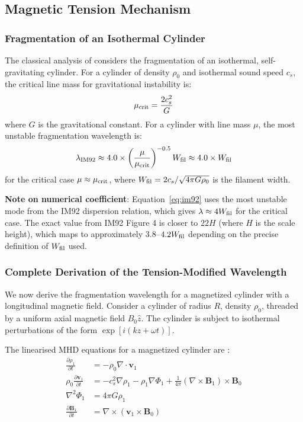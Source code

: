 \documentclass[11pt,a4paper]{article}
\begin{document}
\subsection{Magnetic Tension Mechanism}

\subsubsection{Fragmentation of an Isothermal Cylinder}

The classical analysis of \citet{Inutsuka1992} considers the fragmentation of an isothermal, self-gravitating cylinder. For a cylinder of density $\rho_0$ and isothermal sound speed $c_s$, the critical line mass for gravitational instability is:
\begin{equation}
\mu_{\rm crit} = \frac{2c_s^2}{G}
\end{equation}
where $G$ is the gravitational constant. For a cylinder with line mass $\mu$, the most unstable fragmentation wavelength is:
\begin{equation}
\lambda_{\rm IM92} \approx 4.0 \times \left(\frac{\mu}{\mu_{\rm crit}}\right)^{-0.5} W_{\rm fil} \approx 4.0 \times W_{\rm fil}
\label{eq:im92}
\end{equation}
for the critical case $\mu \approx \mu_{\rm crit}$, where $W_{\rm fil} = 2c_s/\sqrt{4\pi G\rho_0}$ is the filament width.

\textbf{Note on numerical coefficient}: Equation~\ref{eq:im92} uses the most unstable mode from the IM92 dispersion relation, which gives $\lambda \approx 4W_{\rm fil}$ for the critical case. The exact value from IM92 Figure 4 is closer to $22H$ (where $H$ is the scale height), which maps to approximately 3.8--$4.2 W_{\rm fil}$ depending on the precise definition of $W_{\rm fil}$ used.

\subsubsection{Complete Derivation of the Tension-Modified Wavelength}

We now derive the fragmentation wavelength for a magnetized cylinder with a longitudinal magnetic field. Consider a cylinder of radius $R$, density $\rho_0$, threaded by a uniform axial magnetic field $B_0 \hat{z}$. The cylinder is subject to isothermal perturbations of the form $\exp[i(kz + \omega t)]$.

The linearised MHD equations for a magnetized cylinder are \citep{Nakamura1993}:
\begin{align}
\frac{\partial \rho_1}{\partial t} &= -\rho_0 \nabla \cdot \mathbf{v}_1 \\
\rho_0 \frac{\partial \mathbf{v}_1}{\partial t} &= -c_s^2 \nabla \rho_1 - \rho_1 \nabla \Phi_1 + \frac{1}{4\pi}(\nabla \times \mathbf{B}_1) \times \mathbf{B}_0 \\
\nabla^2 \Phi_1 &= 4\pi G \rho_1 \\
\frac{\partial \mathbf{B}_1}{\partial t} &= \nabla \times (\mathbf{v}_1 \times \mathbf{B}_0)
\end{align}
\label{eq:linearised_MHD}
\end{document}
